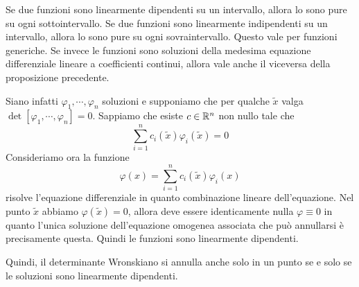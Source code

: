 \documentclass[a4paper]{article}
\begin{document}
\begin{radioactive}
Se due funzioni sono linearmente dipendenti su un intervallo,
allora lo sono pure su ogni sottointervallo.
Se due funzioni sono linearmente indipendenti su un intervallo,
allora lo sono pure su ogni sovraintervallo.
Questo vale per funzioni generiche.
Se invece le funzioni sono soluzioni della medesima equazione differenziale lineare
a coefficienti continui,
allora vale anche il viceversa della proposizione precedente.

Siano infatti \(\varphi_1, \cdots, \varphi_n\)
soluzioni e supponiamo che
per qualche \(\tilde x\)
valga \(\det[\varphi_1, \cdots, \varphi_n] = 0\).
Sappiamo che esiste \(c \in \mathbb{R}^n\) non nullo tale che
\[
    \sum_{i=1}^n c_i(\tilde x)\varphi_i(\tilde x) = 0
\]
Consideriamo ora la funzione
\[
    \varphi(x) = \sum_{i=1}^n c_i(\tilde x)\varphi_i(x)
\]
risolve l'equazione differenziale in quanto combinazione lineare dell'equazione.
Nel punto \(\tilde x\) abbiamo \(\varphi(\tilde x) = 0\), allora deve essere identicamente nulla
\(\varphi \equiv 0\)
in quanto l'unica soluzione dell'equazione omogenea associata che può annullarsi è precisamente questa.
Quindi le funzioni sono linearmente dipendenti.

Quindi, il determinante Wronskiano si annulla anche solo in un punto se e solo se
le soluzioni sono linearmente dipendenti.
\end{radioactive}
\end{document}
